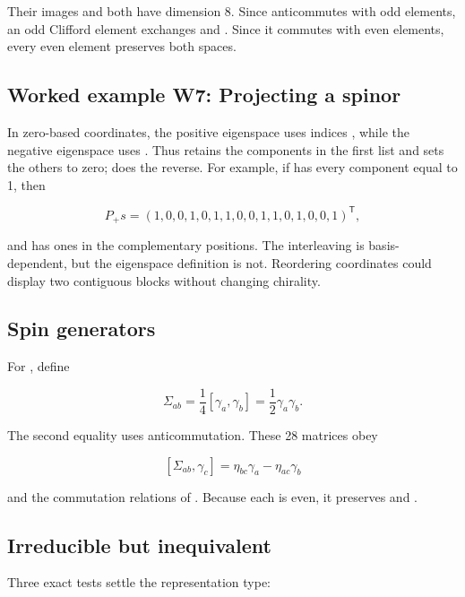 \documentclass[11pt]{article}
\begin{document}
Their images \texttt{} and \texttt{} both have dimension 8. Since \texttt{} anticommutes with odd elements, an odd Clifford element exchanges \texttt{} and \texttt{}. Since it commutes with even elements, every even element preserves both spaces.

\subsection{Worked example W7: Projecting a spinor}

In zero-based coordinates, the positive eigenspace uses indices \texttt{}, while the negative eigenspace uses \texttt{}. Thus \texttt{} retains the components in the first list and sets the others to zero; \texttt{} does the reverse. For example, if \texttt{} has every component equal to 1, then

\[
P_+s=(1,0,0,1,0,1,1,0,0,1,1,0,1,0,0,1)^{\mathsf T},
\]

and \texttt{} has ones in the complementary positions. The interleaving is basis-dependent, but the eigenspace definition is not. Reordering coordinates could display two contiguous blocks without changing chirality.

\subsection{Spin generators}

For \texttt{}, define

\[
\Sigma_{ab}=\frac14[\gamma_a,\gamma_b]
=\frac12\gamma_a\gamma_b.
\]

The second equality uses anticommutation. These 28 matrices obey

\[
[\Sigma_{ab},\gamma_c]
=\eta_{bc}\gamma_a-\eta_{ac}\gamma_b
\]

and the commutation relations of \texttt{}. Because each \texttt{} is even, it preserves \texttt{} and \texttt{}.

\subsection{Irreducible but inequivalent}

Three exact tests settle the representation type:
\end{document}
